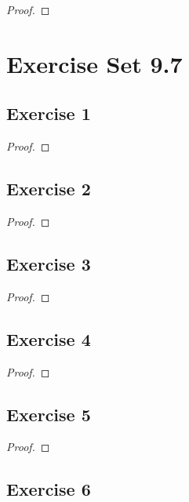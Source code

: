 \documentclass[14pt]{extarticle}
\begin{document}
\begin{proof}

\end{proof}

\section{Exercise Set 9.7}

\subsection{Exercise 1}

\begin{proof}

\end{proof}

\subsection{Exercise 2}

\begin{proof}

\end{proof}

\subsection{Exercise 3}

\begin{proof}

\end{proof}

\subsection{Exercise 4}

\begin{proof}

\end{proof}

\subsection{Exercise 5}

\begin{proof}

\end{proof}

\subsection{Exercise 6}
\end{document}

